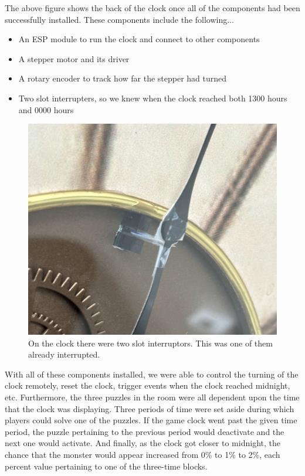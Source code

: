 \documentclass[conference]{IEEEtran}
\begin{document}
\indent The above figure shows the back of the clock once all of the components had been successfully installed. These components include the following...
\begin{itemize}
    \item An ESP module to run the clock and connect to other components
    \item A stepper motor and its driver
    \item A rotary encoder to track how far the stepper had turned
    \item Two slot interrupters, so we knew when the clock reached both 1300 hours and 0000 hours
\end{itemize}
\begin{figure}[ht]
    \centering
    \includegraphics[width=0.90\columnwidth]{Images/slot_interruptor_interrupted.jpg}
    \caption{On the clock there were two slot interruptors. This was one of them already interrupted.}
    \label{fig:slotInterruptor}
\end{figure}
With all of these components installed, we were able to control the turning of the clock remotely, reset the clock, trigger events
when the clock reached midnight, etc. Furthermore, the three puzzles in the room were all dependent upon the time that the clock was displaying.
Three periods of time were set aside during which players could solve one of the puzzles. If the game clock went past the given time period, the
puzzle pertaining to the previous period would deactivate and the next one would activate. And finally, as the clock got closer to midnight,
the chance that the monster would appear increased from 0\% to 1\% to 2\%, each percent value pertaining to one of the three-time blocks. 
\end{document}

